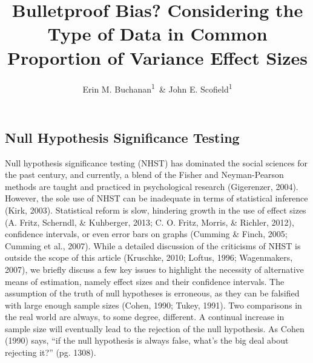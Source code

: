 \documentclass[english,man]{apa6}
\title{Bulletproof Bias? Considering the Type of Data in Common Proportion of
Variance Effect Sizes}
\author{Erin M. Buchanan\textsuperscript{1}~\& John E. Scofield\textsuperscript{1}}
\affiliation{
    \vspace{0.5cm}
          \textsuperscript{1} Missouri State University  }
\theoremstyle{definition}
\theoremstyle{definition}
\theoremstyle{definition}
\theoremstyle{remark}
\begin{document}
\maketitle

\setcounter{secnumdepth}{0}



\subsection{Null Hypothesis Significance
Testing}\label{null-hypothesis-significance-testing}

Null hypothesis significance testing (NHST) has dominated the social
sciences for the past century, and currently, a blend of the Fisher and
Neyman-Pearson methods are taught and practiced in psychological
research (Gigerenzer, 2004). However, the sole use of NHST can be
inadequate in terms of statistical inference (Kirk, 2003). Statistical
reform is slow, hindering growth in the use of effect sizes (A. Fritz,
Scherndl, \& Kuhberger, 2013; C. O. Fritz, Morris, \& Richler, 2012),
confidence intervals, or even error bars on graphs (Cumming \& Finch,
2005; Cumming et al., 2007). While a detailed discussion of the
criticisms of NHST is outside the scope of this article (Kruschke, 2010;
Loftus, 1996; Wagenmakers, 2007), we briefly discuss a few key issues to
highlight the necessity of alternative means of estimation, namely
effect sizes and their confidence intervals. The assumption of the truth
of null hypotheses is erroneous, as they can be falsified with large
enough sample sizes (Cohen, 1990; Tukey, 1991). Two comparisons in the
real world are always, to some degree, different. A continual increase
in sample size will eventually lead to the rejection of the null
hypothesis. As Cohen (1990) says, \enquote{if the null hypothesis is
always false, what's the big deal about rejecting it?} (pg. 1308).
\end{document}
